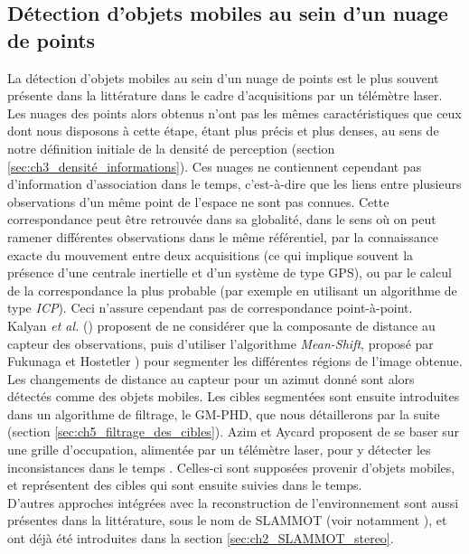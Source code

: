 \subsection{Détection d'objets mobiles au sein d'un nuage de points}
La détection d'objets mobiles au sein d'un nuage de points est le plus souvent présente dans la littérature dans le cadre d'acquisitions par un télémètre laser. Les nuages des points alors obtenus n'ont pas les mêmes caractéristiques que ceux dont nous disposons à cette étape, étant plus précis et plus denses, au sens de notre définition initiale de la densité de perception (section \ref{sec:ch3_densité_informations}). Ces nuages ne contiennent cependant pas d'information d'association dans le temps, c'est-à-dire que les liens entre plusieurs observations d'un même point de l'espace ne sont pas connues. Cette correspondance peut être retrouvée dans sa globalité, dans le sens où on peut ramener différentes observations dans le même référentiel, par la connaissance exacte du mouvement entre deux acquisitions (ce qui implique souvent la présence d'une centrale inertielle et d'un système de type GPS), ou par le calcul de la correspondance la plus probable (par exemple en utilisant un algorithme de type \emph{ICP}). Ceci n'assure cependant pas de correspondance point-à-point.\\
Kalyan \textit{et al.} (\cite{Kalyan2010}) proposent de ne considérer que la composante de distance au capteur des observations, puis d'utiliser l'algorithme \emph{Mean-Shift}, proposé par Fukunaga et Hostetler \cite{Fukunaga1975}) pour segmenter les différentes régions de l'image obtenue. Les changements de distance au capteur pour un azimut donné sont alors détectés comme des objets mobiles. Les cibles segmentées sont ensuite introduites dans un algorithme de filtrage, le GM-PHD, que nous détaillerons par la suite (section \ref{sec:ch5_filtrage_des_cibles}). Azim et Aycard proposent de se baser sur une grille d'occupation, alimentée par un télémètre laser, pour y détecter les inconsistances dans le temps \cite{Azim}. Celles-ci sont supposées provenir d'objets mobiles, et représentent des cibles qui sont ensuite suivies dans le temps. \\
D'autres approches intégrées avec la reconstruction de l'environnement sont aussi présentes dans la littérature, sous le nom de SLAMMOT (voir notamment \cite{Wang2007, Vu2009}), et ont déjà été introduites dans la section \ref{sec:ch2_SLAMMOT_stereo}.

